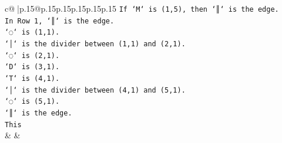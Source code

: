 \documentclass{article}
\begin{document}
{\begin{supertabular}{c@{$\;$}|p{.15\linewidth}@{}p{.15\linewidth}p{.15\linewidth}p{.15\linewidth}p{.15\linewidth}p{.15\linewidth}}
{{{\texttt{If `M` is (1,5), then `║` is the edge.} \\
\texttt{In Row 1, `║` is the edge.} \\
\texttt{`◌` is (1,1).} \\
\texttt{`│` is the divider between (1,1) and (2,1).} \\
\texttt{`◌` is (2,1).} \\
\texttt{`D` is (3,1).} \\
\texttt{`T` is (4,1).} \\
\texttt{`│` is the divider between (4,1) and (5,1).} \\
\texttt{`◌` is (5,1).} \\
\texttt{`║` is the edge.} \\
\texttt{This} \\
            }
        }
    }
    & & \\ \\


\end{supertabular}}
\end{document}
